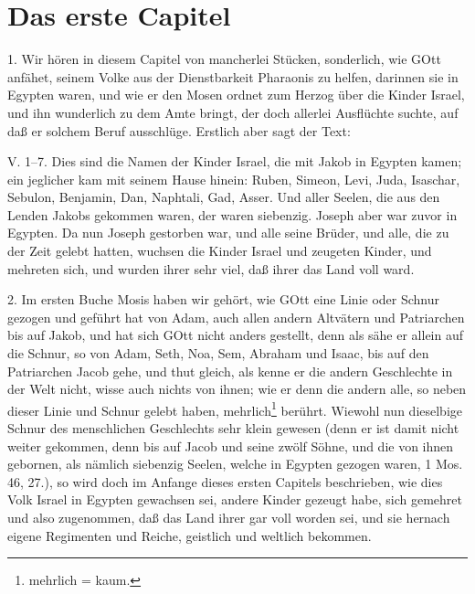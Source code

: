 \section{Das erste Capitel}

1. Wir hören in diesem Capitel von mancherlei Stücken, sonderlich, wie GOtt anfähet, seinem Volke aus der Dienstbarkeit Pharaonis zu helfen, darinnen sie in Egypten waren, und wie er den Mosen ordnet zum Herzog über die Kinder Israel, und ihn wunderlich zu dem Amte bringt, der doch allerlei Ausflüchte suchte, auf daß er solchem Beruf ausschlüge. Erstlich aber sagt der Text:

\begin{schriftzitat}
V. 1–7. Dies sind die Namen der Kinder Israel, die mit Jakob in Egypten kamen; ein jeglicher kam mit seinem Hause hinein: Ruben, Simeon, Levi, Juda, Isaschar, Sebulon, Benjamin, Dan, Naphtali, Gad, Asser. Und aller Seelen, die aus den Lenden Jakobs gekommen waren, der waren siebenzig. Joseph aber war zuvor in Egypten. Da nun Joseph gestorben war, und alle seine Brüder, und alle, die zu der Zeit gelebt hatten, wuchsen die Kinder Israel und zeugeten Kinder, und mehreten sich, und wurden ihrer sehr viel, daß ihrer das Land voll ward.
\end{schriftzitat}

2. Im ersten Buche Mosis haben wir gehört, wie GOtt eine Linie oder Schnur gezogen und geführt hat von Adam, auch allen andern Altvätern und Patriarchen bis auf Jakob, und hat sich GOtt nicht anders gestellt, denn als sähe er allein auf die Schnur, so von Adam, Seth, Noa, Sem, Abraham und Isaac, bis auf den Patriarchen
Jacob gehe, und thut gleich, als kenne er die andern Geschlechte in der Welt nicht, wisse auch nichts von ihnen; wie er denn die andern alle, so neben dieser Linie und Schnur gelebt haben, mehrlich\footnote{mehrlich = kaum.} berührt. Wiewohl nun dieselbige Schnur des menschlichen Geschlechts sehr klein gewesen (denn er ist damit nicht weiter gekommen, denn bis auf Jacob und seine zwölf Söhne, und die von ihnen gebornen, als nämlich siebenzig Seelen, welche in Egypten gezogen waren, 1 Mos. 46, 27.), so wird doch im Anfange dieses ersten Capitels beschrieben, wie dies Volk Israel in Egypten gewachsen sei, andere Kinder gezeugt habe, sich gemehret und also zugenommen, daß das Land ihrer gar voll worden sei, und sie hernach eigene Regimenten und Reiche, geistlich und weltlich bekommen.

